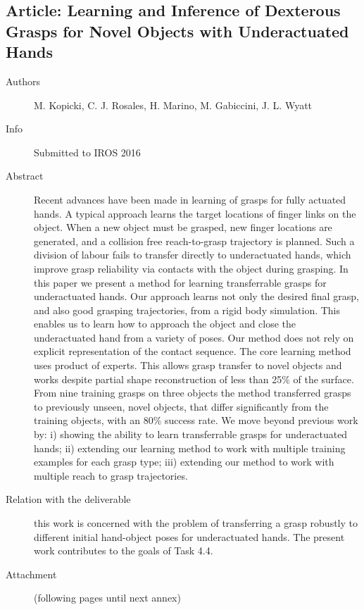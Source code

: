 \documentclass[a4paper,11pt,pdf]{pacmanreport}
\begin{document}
\subsection{Article: Learning and Inference of Dexterous Grasps for Novel Objects with Underactuated Hands}
\label{ann:LearningInferenceUnderactuatedHands}
\begin{description}
    \item[Authors] M. Kopicki, C. J. Rosales, H. Marino, M. Gabiccini, J. L. Wyatt
    \item[Info] Submitted to IROS 2016
    \item[Abstract] Recent advances have been made in learning of grasps for fully actuated hands. A typical approach learns the target locations of finger links on the object. When a new object must be grasped, new finger locations are generated, and a collision free reach-to-grasp trajectory is planned. Such a division of labour fails to transfer directly to underactuated hands, which improve grasp reliability via contacts with the object during grasping. In this paper we present a method for learning transferrable grasps for underactuated hands. Our approach learns not only the desired final grasp, and also good grasping trajectories, from a rigid body simulation. This enables us to learn how to approach the object and close the underactuated hand from a variety of poses. Our method does not rely on explicit representation of the contact sequence.
The core learning method uses product of experts. This allows grasp transfer to novel objects and works despite partial shape reconstruction of less than 25\% of the surface. From nine training grasps on three objects the method transferred grasps to previously unseen, novel objects, that differ significantly from the training objects, with an 80\% success rate. We move beyond previous work by: i) showing the ability to learn transferrable grasps for underactuated hands; ii) extending our learning
method to work with multiple training examples for each grasp
type; iii) extending our method to work with multiple reach to
grasp trajectories.
    \item[Relation with the deliverable] this work is concerned with the problem of transferring a grasp robustly to different initial hand-object poses for underactuated hands. The present work contributes to the goals of Task 4.4.
    \item[Attachment] (following pages until next annex)
\end{description}

\end{document}
